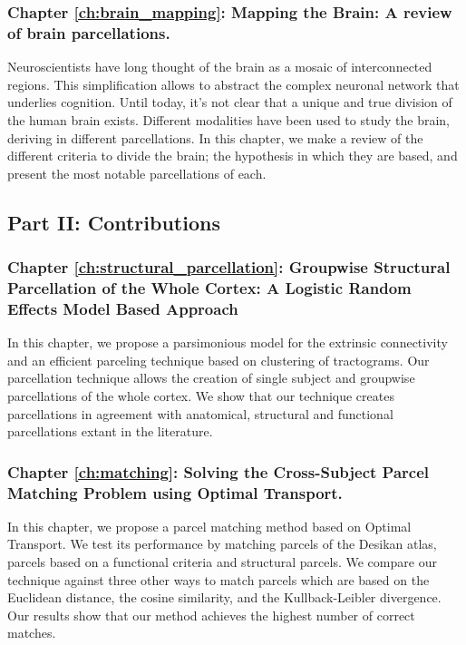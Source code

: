\subsubsection{Chapter \ref{ch:brain_mapping}: Mapping the Brain: A review of brain parcellations.}
Neuroscientists have long thought of the brain as a mosaic of interconnected
regions. This simplification allows to abstract the complex neuronal network
that underlies cognition. Until today, it's not clear that a unique and true
division of the human brain exists. Different modalities have been used to
study the brain, deriving in different parcellations. In this chapter, we make
a review of the different criteria to divide the brain; the hypothesis in
which they are based, and present the most notable parcellations of each.

\subsection{Part II: Contributions}

\subsubsection{Chapter \ref{ch:structural_parcellation}: Groupwise Structural Parcellation of the Whole Cortex: A Logistic Random Effects Model Based Approach}
In this chapter, we propose a parsimonious model for the extrinsic connectivity
and an efficient parceling technique based on clustering of tractograms. 
Our parcellation technique allows the creation of single subject and groupwise parcellations
of the whole cortex. We show that our technique creates parcellations in
agreement with anatomical, structural and functional parcellations extant in 
the literature.

\subsubsection{Chapter \ref{ch:matching}: Solving the Cross-Subject Parcel Matching Problem using Optimal Transport.}
In this chapter, we propose a parcel matching method based on Optimal Transport.
We test its performance by matching parcels of the Desikan atlas, parcels based
on a functional criteria and structural parcels. We compare our technique against
three other ways to match parcels which are based on the Euclidean distance, the
cosine similarity, and the Kullback-Leibler divergence. Our results show that
our method achieves the highest number of correct matches.

